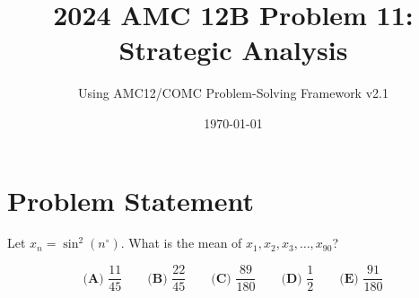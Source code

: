 \documentclass[12pt]{article}
\title{\textbf{2024 AMC 12B Problem 11:\\Strategic Analysis}}
\author{Using AMC12/COMC Problem-Solving Framework v2.1}
\date{\today}
\begin{document}
\maketitle

\section*{Problem Statement}

Let $x_n = \sin^2(n^{\circ})$. What is the mean of $x_1, x_2, x_3, \ldots, x_{90}$?

\[
\textbf{(A) } \frac{11}{45} \qquad 
\textbf{(B) } \frac{22}{45} \qquad 
\textbf{(C) } \frac{89}{180} \qquad 
\textbf{(D) } \frac{1}{2} \qquad 
\textbf{(E) } \frac{91}{180}
\]

\vspace{1em}
\end{document}
